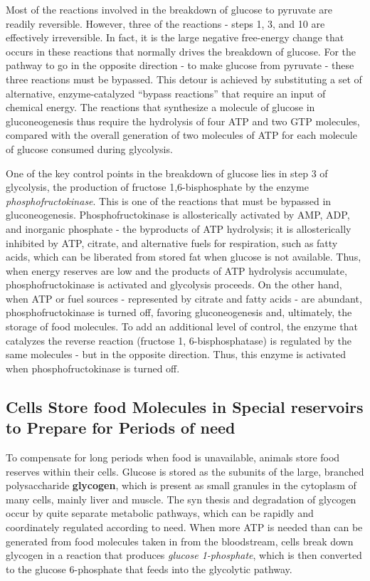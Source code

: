 Most of the reactions involved in the breakdown of glucose to pyruvate
are readily reversible. However, three of the reactions - steps 1, 3, and 10
are effectively irreversible. In fact, it is the large negative
free-energy change that occurs in these reactions that normally drives the
breakdown of glucose. For the pathway to go in the opposite direction - to
make glucose from pyruvate - these three reactions must be bypassed.
This detour is achieved by substituting a set of alternative, enzyme-catalyzed
“bypass reactions” that require an input of chemical energy.
The reactions that synthesize 	a molecule of glucose in gluconeogenesis thus require the hydrolysis of
four ATP and two GTP molecules, compared with the overall generation
of two molecules of ATP for each molecule of glucose consumed during
glycolysis.

One of the key control points in the breakdown of glucose lies in step 3
of glycolysis, the production of fructose 1,6-bisphosphate by the enzyme
\textit{phosphofructokinase}. This is one of the reactions that must be bypassed
in gluconeogenesis. Phosphofructokinase is allosterically activated by AMP, ADP, and
inorganic phosphate - the byproducts of ATP hydrolysis; it is allosterically
inhibited by ATP, citrate, and alternative fuels for respiration, such as
fatty acids, which can be liberated from stored fat when glucose is not
available. Thus, when energy reserves are low and the products of ATP
hydrolysis accumulate, phosphofructokinase is activated and glycolysis
proceeds. On the other hand, when ATP or fuel sources - represented
by citrate and fatty acids - are abundant, phosphofructokinase is turned
off, favoring gluconeogenesis and, ultimately, the storage of food molecules.
To add an additional level of control, the enzyme that catalyzes
the reverse reaction (fructose 1, 6-bisphosphatase)
is regulated by the same molecules - but in the opposite
direction. Thus, this enzyme is activated when phosphofructokinase
is turned off.

\subsection{Cells Store food Molecules in Special reservoirs to Prepare for Periods of need}

To compensate for long periods when food
is unavailable, animals store food reserves within their cells. Glucose is
stored as the subunits of the large, branched polysaccharide \textbf{glycogen},
which is present as small granules in the cytoplasm of many cells, mainly
liver and muscle. The syn thesis and degradation of glycogen occur by quite separate metabolic
pathways, which can be rapidly and coordinately regulated according
to need. When more ATP is needed than can be generated from food
molecules taken in from the bloodstream, cells break down glycogen in
a reaction that produces \textit{glucose 1-phosphate}, which is then converted to
the glucose 6-phosphate that feeds into the glycolytic pathway.

